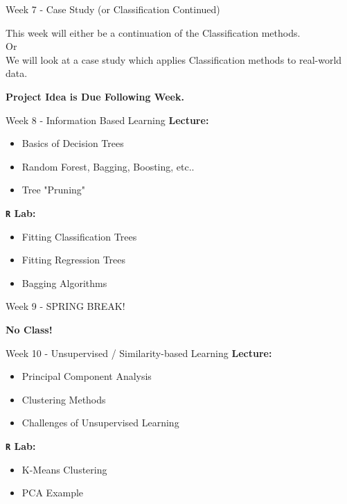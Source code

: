 \documentclass[aspectratio=169,xcolor=dvipsnames]{beamer}
\begin{document}
\begin{frame}{Week 7 - Case Study (or Classification Continued)}
    \begin{center}
    
        This week will either be a continuation of the Classification methods. \\ 
        \vspace{1cm}
        Or \\
        \vspace{1cm}
        We will look at a case study which applies Classification methods to real-world data.
    \end{center}
\vspace{1cm}
\small\textbf{Project Idea is Due Following Week.}
\end{frame}

\begin{frame}{Week 8 - Information Based Learning}
\textbf{Lecture:}
    \begin{itemize}
        \setlength{\itemsep}{.25cm}
        \item Basics of Decision Trees
        \item Random Forest, Bagging, Boosting, etc..
        \item Tree "Pruning"
    \end{itemize}
\textbf{\texttt{R} Lab:}
    \begin{itemize}
    \setlength{\itemsep}{.25cm}
        \item Fitting Classification Trees
        \item Fitting Regression Trees
        \item Bagging Algorithms
    \end{itemize}
\end{frame}

\begin{frame}{Week 9 - SPRING BREAK!}
    \begin{center}
        \textbf{No Class!}
    \end{center}
\end{frame}

\begin{frame}{Week 10 - Unsupervised / Similarity-based Learning}
    \textbf{Lecture:}
    \begin{itemize}
        \setlength{\itemsep}{.25cm}
        \item Principal Component Analysis
        \item Clustering Methods
        \item Challenges of Unsupervised Learning
    \end{itemize}
\textbf{\texttt{R} Lab:}
    \begin{itemize}
    \setlength{\itemsep}{.25cm}
        \item K-Means Clustering
        \item PCA Example
    \end{itemize}
\end{frame}
\end{document}
